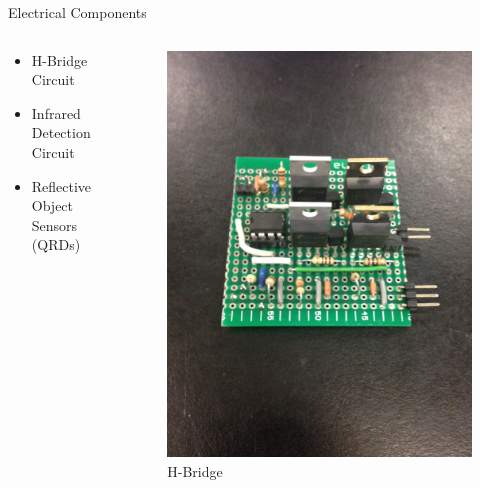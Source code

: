 \documentclass[aspectratio=43]{beamer}
\begin{document}
  \begin{frame}{Electrical Components}
    \begin{columns}[c]
      \begin{column}[c]{5cm}
        \begin{itemize}
          \item H-Bridge Circuit
          \item Infrared Detection Circuit
          \item Reflective Object Sensors (QRDs)
        \end{itemize}
      \end{column}
      \begin{column}[c]{5cm}
        \begin{figure}[h]
          \centering
          \includegraphics[scale=0.05, angle=-90]{HBridge.jpeg}
          \vspace{7pt}
          \large{H-Bridge}
        \end{figure}
      \end{column}
    \end{columns}
  \end{frame} 
  
\end{document}
